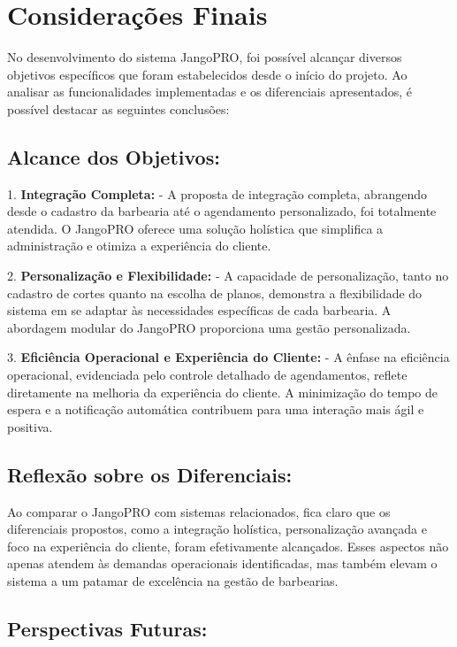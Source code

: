 \documentclass[12pt]{article}
\begin{document}
\section{Considerações Finais}

No desenvolvimento do sistema JangoPRO, foi possível alcançar diversos objetivos específicos que foram estabelecidos desde o início do projeto. Ao analisar as funcionalidades implementadas e os diferenciais apresentados, é possível destacar as seguintes conclusões:

\subsection{Alcance dos Objetivos:}

1. \textbf{Integração Completa:}
   - A proposta de integração completa, abrangendo desde o cadastro da barbearia até o agendamento personalizado, foi totalmente atendida. O JangoPRO oferece uma solução holística que simplifica a administração e otimiza a experiência do cliente.

2. \textbf{Personalização e Flexibilidade:}
   - A capacidade de personalização, tanto no cadastro de cortes quanto na escolha de planos, demonstra a flexibilidade do sistema em se adaptar às necessidades específicas de cada barbearia. A abordagem modular do JangoPRO proporciona uma gestão personalizada.

3. \textbf{Eficiência Operacional e Experiência do Cliente:}
   - A ênfase na eficiência operacional, evidenciada pelo controle detalhado de agendamentos, reflete diretamente na melhoria da experiência do cliente. A minimização do tempo de espera e a notificação automática contribuem para uma interação mais ágil e positiva.

\subsection{Reflexão sobre os Diferenciais:}

Ao comparar o JangoPRO com sistemas relacionados, fica claro que os diferenciais propostos, como a integração holística, personalização avançada e foco na experiência do cliente, foram efetivamente alcançados. Esses aspectos não apenas atendem às demandas operacionais identificadas, mas também elevam o sistema a um patamar de excelência na gestão de barbearias.

\subsection{Perspectivas Futuras:}
\end{document}
